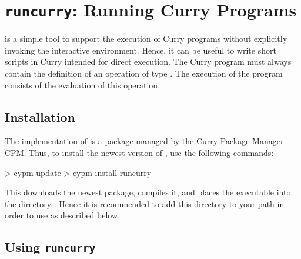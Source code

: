 \section{\texttt{runcurry}: Running Curry Programs}

is a simple tool to support the execution of Curry programs
without explicitly invoking the interactive environment.
Hence, it can be useful to write short scripts in Curry
intended for direct execution.
The Curry program must always contain the definition of an operation
 of type .
The execution of the program consists of the evaluation of this operation.

\subsection{Installation}

The implementation of  is a package
managed by the Curry Package Manager CPM.
Thus, to install the newest version of ,
use the following commands:
%
\begin{curry}
> cypm update
> cypm install runcurry
\end{curry}
%
This downloads the newest package, compiles it, and places
the executable  into the directory .
Hence it is recommended to add this directory to your path
in order to use  as described below.

\subsection{Using \texttt{runcurry}}

